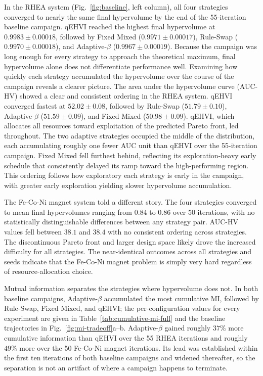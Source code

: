 In the RHEA system (Fig.~\ref{fig:baseline}, left column), all four strategies converged to nearly the same final hypervolume by the end of the 55-iteration baseline campaign. qEHVI reached the highest final hypervolume at $0.9983 \pm 0.00018$, followed by Fixed Mixed ($0.9971 \pm 0.00017$), Rule-Swap ($0.9970 \pm 0.00018$), and Adaptive-$\beta$ ($0.9967 \pm 0.00019$). Because the campaign was long enough for every strategy to approach the theoretical maximum, final hypervolume alone does not differentiate performance well. Examining how quickly each strategy accumulated the hypervolume over the course of the campaign reveals a clearer picture.
The area under the hypervolume curve (AUC-HV) showed a clear and consistent ordering in the RHEA system. qEHVI converged fastest at $52.02 \pm 0.08$, followed by Rule-Swap ($51.79 \pm 0.10$), Adaptive-$\beta$ ($51.59 \pm 0.09$), and Fixed Mixed ($50.98 \pm 0.09$). qEHVI, which allocates all resources toward exploitation of the predicted Pareto front, led throughout. The two adaptive strategies occupied the middle of the distribution, each accumulating roughly one fewer AUC unit than qEHVI over the 55-iteration campaign. Fixed Mixed fell furthest behind, reflecting its exploration-heavy early schedule that consistently delayed its ramp toward the high-performing region. This ordering follows how exploratory each strategy is early in the campaign, with greater early exploration yielding slower hypervolume accumulation.

The Fe-Co-Ni magnet system told a different story. The four strategies converged to mean final hypervolumes ranging from $0.84$ to $0.86$ over 50 iterations, with no statistically distinguishable differences between any strategy pair. AUC-HV values fell between $38.1$ and $38.4$ with no consistent ordering across strategies. The discontinuous Pareto front and larger design space likely drove the increased difficulty for all strategies. The near-identical outcomes across all strategies and seeds indicate that the Fe-Co-Ni magnet problem is simply very hard regardless of resource-allocation choice.

Mutual information separates the strategies where hypervolume does not. In both baseline campaigns, Adaptive-$\beta$ accumulated the most cumulative MI, followed by Rule-Swap, Fixed Mixed, and qEHVI; the per-configuration values for every experiment are given in Table~\ref{tab:cumulative-mi-full} and the baseline trajectories in Fig.~\ref{fig:mi-tradeoff}a--b. Adaptive-$\beta$ gained roughly $37\%$ more cumulative information than qEHVI over the 55 RHEA iterations and roughly $49\%$ more over the 50 Fe-Co-Ni magnet iterations. Its lead was established within the first ten iterations of both baseline campaigns and widened thereafter, so the separation is not an artifact of where a campaign happens to terminate.
